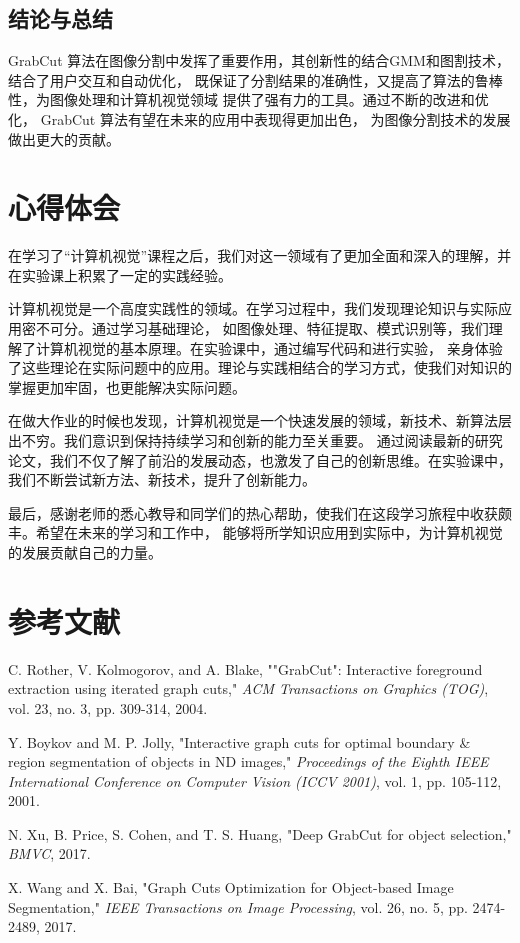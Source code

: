 \documentclass[12pt,a4paper]{article}
\begin{document}
\begin{CJK}{UTF8}{gbsn}
\begin{sloppypar}
\subsection{结论与总结}
GrabCut 算法在图像分割中发挥了重要作用，其创新性的结合GMM和图割技术，结合了用户交互和自动优化，
既保证了分割结果的准确性，又提高了算法的鲁棒性，为图像处理和计算机视觉领域
提供了强有力的工具。通过不断的改进和优化， GrabCut 算法有望在未来的应用中表现得更加出色，
为图像分割技术的发展做出更大的贡献。

\section{心得体会}
在学习了“计算机视觉”课程之后，我们对这一领域有了更加全面和深入的理解，并在实验课上积累了一定的实践经验。

计算机视觉是一个高度实践性的领域。在学习过程中，我们发现理论知识与实际应用密不可分。通过学习基础理论，
如图像处理、特征提取、模式识别等，我们理解了计算机视觉的基本原理。在实验课中，通过编写代码和进行实验，
亲身体验了这些理论在实际问题中的应用。理论与实践相结合的学习方式，使我们对知识的掌握更加牢固，也更能解决实际问题。

在做大作业的时候也发现，计算机视觉是一个快速发展的领域，新技术、新算法层出不穷。我们意识到保持持续学习和创新的能力至关重要。
通过阅读最新的研究论文，我们不仅了解了前沿的发展动态，也激发了自己的创新思维。在实验课中，
我们不断尝试新方法、新技术，提升了创新能力。

最后，感谢老师的悉心教导和同学们的热心帮助，使我们在这段学习旅程中收获颇丰。希望在未来的学习和工作中，
能够将所学知识应用到实际中，为计算机视觉的发展贡献自己的力量。

\section{参考文献}
\begin{thebibliography}{9}
    
    C. Rother, V. Kolmogorov, and A. Blake, ""GrabCut": Interactive foreground extraction using iterated graph cuts," \textit{ACM Transactions on Graphics (TOG)}, vol. 23, no. 3, pp. 309-314, 2004.
    
    Y. Boykov and M. P. Jolly, "Interactive graph cuts for optimal boundary \& region segmentation of objects in ND images," \textit{Proceedings of the Eighth IEEE International Conference on Computer Vision (ICCV 2001)}, vol. 1, pp. 105-112, 2001.
    
    N. Xu, B. Price, S. Cohen, and T. S. Huang, "Deep GrabCut for object selection," \textit{BMVC}, 2017.
    
    X. Wang and X. Bai, "Graph Cuts Optimization for Object-based Image Segmentation," \textit{IEEE Transactions on Image Processing}, vol. 26, no. 5, pp. 2474-2489, 2017.
    \end{thebibliography}
\end{sloppypar}
\end{CJK}
\end{document}
